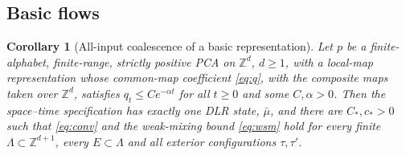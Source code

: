 \documentclass[11pt]{article}
\theoremstyle{plain}
\newtheorem{corollary}[theorem]{Corollary}
\theoremstyle{definition}
\theoremstyle{remark}
\newcommand{\Z}{\mathbb{Z}}
\newcommand{\Lam}{\Lambda}
\newcommand{\ba}{\bar{\mu}}
\begin{document}
\subsection{Basic flows}

\begin{corollary}[All-input coalescence of a basic representation]
\label{cor:basic}
Let $p$ be a finite-alphabet, finite-range, strictly positive PCA on $\Z^d$, $d\ge1$, with a local-map representation whose common-map coefficient \eqref{eq:q}, with the composite maps taken over $\Z^d$, satisfies $q_t\le Ce^{-\alpha t}$ for all $t\ge0$ and some $C,\alpha>0$. Then the space--time specification has exactly one DLR state, $\ba$, and there are $C_*,c_*>0$ such that \eqref{eq:conv} and the weak-mixing bound \eqref{eq:wsm} hold for every finite $\Lam\subset\Z^{d+1}$, every $E\subset\Lam$ and all exterior configurations $\tau,\tau'$.
\end{corollary}
\end{document}
